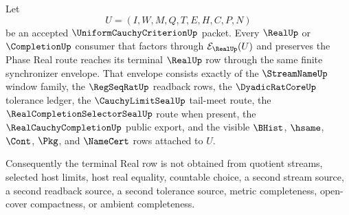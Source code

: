 \begin{theorem}
\label{thm:uniform-cauchy-criterion-real-completion-synchronizer-terminal-envelope}
Let
$$
U=(I,W,M,Q,T,E,H,C,P,N)
$$
be an accepted $\UniformCauchyCriterionUp$ packet. Every $\RealUp$ or $\CompletionUp$ consumer that factors through $\mathcal{E}_{\RealUp}(U)$ and preserves the Phase Real route reaches its terminal $\RealUp$ row through the same finite synchronizer envelope. That envelope consists exactly of the $\StreamNameUp$ window family, the $\RegSeqRatUp$ readback rows, the $\DyadicRatCoreUp$ tolerance ledger, the $\CauchyLimitSealUp$ tail-meet route, the $\RealCompletionSelectorSealUp$ route when present, the $\RealCauchyCompletionUp$ public export, and the visible $\BHist$, $\hsame$, $\Cont$, $\Pkg$, and $\NameCert$ rows attached to $U$.

Consequently the terminal Real row is not obtained from quotient streams, selected host limits, host real equality, countable choice, a second stream source, a second readback source, a second tolerance source, metric completeness, open-cover compactness, or ambient completeness.
\end{theorem}
